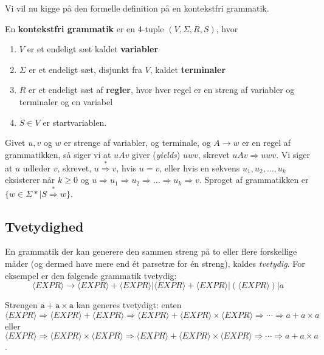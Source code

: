 Vi vil nu kigge på den formelle definition på en kontekstfri grammatik.

\begin{definition}
  En \textbf{kontekstfri grammatik}   er en 4-tuple $(V, \Sigma, R, S)$, hvor
  \begin{enumerate}
    \item $V$ er et endeligt sæt kaldet \textbf{variabler}
    \item $\Sigma$ er et endeligt sæt, disjunkt fra $V$, kaldet \textbf{terminaler}
    \item $R$ er et endeligt sæt af \textbf{regler}, hvor hver regel er en streng af variabler og terminaler og en variabel
    \item $S \in V$ er startvariablen.
  \end{enumerate}

\end{definition}

Givet $u, v$ og $w$ er strenge af variabler, og terminale, og $A \rightarrow w$ er en regel af grammatikken, så siger vi at $uAv$ giver (\textit{yields}) $uwv$, skrevet $uAv \Rightarrow uwv$. Vi siger at $u$ udleder $v$, skrevet, $u \stackrel{*}{\Rightarrow} v$, hvis $u = v$, eller hvis en sekvens $u_{1}, u_{2}, \ldots, u_{k}$ eksisterer når $k \geq 0$ og $u \Rightarrow u_{1} \Rightarrow u_{2} \Rightarrow \ldots \Rightarrow u_{k} \Rightarrow v$. Sproget af grammatikken er $\{w \in \Sigma* | S \stackrel{*}{\Rightarrow} w\}$.

\newpage
\subsection{Tvetydighed}%
\label{sub:tvetydighed}

En grammatik der kan generere den sammen streng på to eller flere forskellige måder (og dermed have mere end ét parsetræ for én streng), kaldes \textit{tvetydig}. For eksempel er den følgende grammatik tvetydig:
\[
\langle EXPR \rangle \rightarrow \langle EXPR \rangle + \langle EXPR \rangle | \langle EXPR \rangle + \langle EXPR \rangle | ( \langle EXPR \rangle ) | a
\]

Strengen $\mathtt{a + a \times a}$ kan generes tvetydigt: enten $$\langle EXPR \rangle \Rightarrow \langle EXPR \rangle + \langle EXPR \rangle \Rightarrow \langle EXPR \rangle + \langle EXPR \rangle \times \langle EXPR \rangle \Rightarrow \cdots \Rightarrow a + a \times a$$ eller $$\langle EXPR \rangle \Rightarrow \langle EXPR \rangle \times \langle EXPR \rangle \Rightarrow \langle EXPR \rangle + \langle EXPR \rangle \times \langle EXPR \rangle \Rightarrow \cdots \Rightarrow a + a \times a$$.

